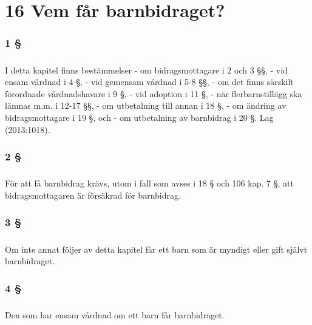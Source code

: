 \documentclass[a4paper,notitlepage,openany,10pt]{book}
\begin{document}
\chapter*{16 Vem får barnbidraget?}
\subsection*{1 §}
\paragraph*{}
I detta kapitel finns bestämmelser
\newline - om bidragsmottagare i 2 och 3 §§,
\newline - vid ensam vårdnad i 4 §,
\newline - vid gemensam vårdnad i 5-8 §§,
\newline - om det finns särskilt förordnade vårdnadshavare i 9 §,
\newline - vid adoption i 11 §,
\newline - när flerbarnstillägg ska lämnas m.m. i 12-17 §§,
\newline - om utbetalning till annan i 18 §,
\newline - om ändring av bidragsmottagare i 19 §, och
\newline - om utbetalning av barnbidrag i 20 §.
Lag (2013:1018).
\subsection*{2 §}
\paragraph*{}
För att få barnbidrag krävs, utom i fall som avses i 18 § och 106 kap. 7 §, att bidragsmottagaren är försäkrad för barnbidrag.
\subsection*{3 §}
\paragraph*{}
Om inte annat följer av detta kapitel får ett barn som är myndigt eller gift självt barnbidraget.
\subsection*{4 §}
\paragraph*{}
Den som har ensam vårdnad om ett barn får barnbidraget.
\end{document}
